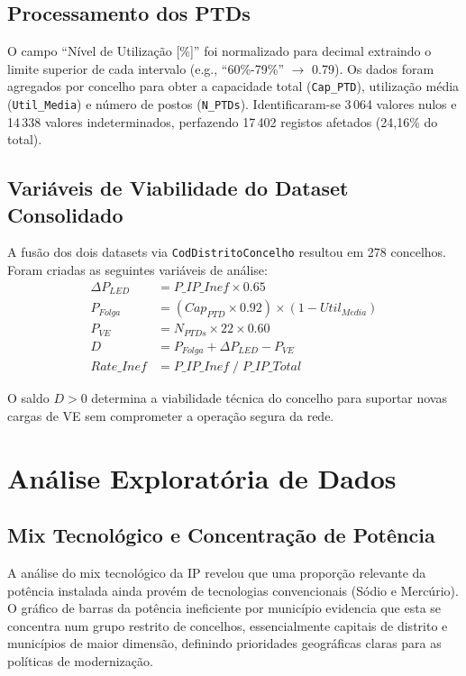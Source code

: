 \documentclass[conference]{IEEEtran}
\begin{document}
\subsection{Processamento dos PTDs}

O campo ``Nível de Utilização [\%]'' foi normalizado para decimal extraindo o limite superior de cada intervalo (e.g., ``60\%-79\%'' $\to$ 0.79). Os dados foram agregados por concelho para obter a capacidade total (\texttt{Cap\_PTD}), utilização média (\texttt{Util\_Media}) e número de postos (\texttt{N\_PTDs}). Identificaram-se 3\,064 valores nulos e 14\,338 valores indeterminados, perfazendo 17\,402 registos afetados (24,16\% do total).

\subsection{Variáveis de Viabilidade do Dataset Consolidado}

A fusão dos dois datasets via \texttt{CodDistritoConcelho} resultou em 278 concelhos. Foram criadas as seguintes variáveis de análise:
\begin{align}
\Delta P_{LED}  &= P\_IP\_Inef \times 0.65 \label{eq:dpled}\\
P_{Folga}       &= (Cap_{PTD} \times 0.92) \times (1 - Util_{Media}) \label{eq:pfolga}\\
P_{VE}          &= N_{PTDs} \times 22 \times 0.60 \label{eq:pve}\\
D               &= P_{Folga} + \Delta P_{LED} - P_{VE} \label{eq:d}\\
Rate\_Inef      &= P\_IP\_Inef \;/\; P\_IP\_Total \label{eq:rate}
\end{align}

O saldo $D > 0$ determina a viabilidade técnica do concelho para suportar novas cargas de VE sem comprometer a operação segura da rede.

\section{Análise Exploratória de Dados}

\subsection{Mix Tecnológico e Concentração de Potência}

A análise do mix tecnológico da IP revelou que uma proporção relevante da potência instalada ainda provém de tecnologias convencionais (Sódio e Mercúrio). O gráfico de barras da potência ineficiente por município evidencia que esta se concentra num grupo restrito de concelhos, essencialmente capitais de distrito e municípios de maior dimensão, definindo prioridades geográficas claras para as políticas de modernização.
\end{document}
